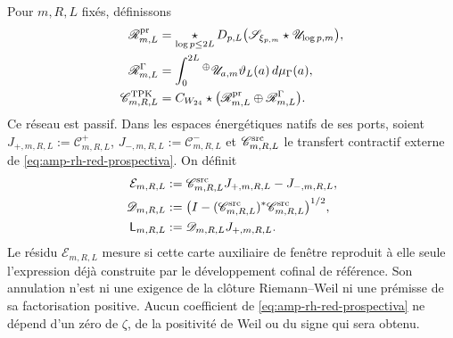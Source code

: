 \begin{theorem}
\label{thm:amp-rh-acoplamiento-prospectivo}
Pour \(m,R,L\) fixés, définissons
\begin{align}
 \mathscr R^{\rm pr}_{m,L}
 &=
 \mathop{\star}_{\log p\leq2L}
 D_{p,L}\bigl(\mathscr S_{\xi_{p,m}}\star
              \mathscr U_{\log p,m}\bigr),\nonumber\\
 \mathscr R^\Gamma_{m,L}
 &=
 \int_0^{2L}{}^\oplus
 \mathscr U_{a,m}
 \vartheta_L(a)\,d\mu_\Gamma(a),\nonumber\\
 \mathscr C^{\rm TPK}_{m,R,L}
 &=C_{W_{24}}\star
 \bigl(\mathscr R^{\rm pr}_{m,L}
       \oplus\mathscr R^\Gamma_{m,L}\bigr).
 \label{eq:amp-rh-red-prospectiva}
\end{align}
Ce réseau est passif. Dans les espaces énergétiques natifs de ses ports, soient \(J_{+,m,R,L}:=\mathcal C^+_{m,R,L}\), \(J_{-,m,R,L}:=\mathcal C^-_{m,R,L}\) et \(\mathscr C^{\rm src}_{m,R,L}\) le transfert contractif externe de \eqref{eq:amp-rh-red-prospectiva}. On définit
\begin{equation}\label{eq:amp-rh-publicaciones-construidas}
 \begin{aligned}
 \mathcal E_{m,R,L}
 &:=\mathscr C^{\rm src}_{m,R,L}J_{+,m,R,L}
    -J_{-,m,R,L},\\
 \mathscr D_{m,R,L}
 &:=\bigl(I-(\mathscr C^{\rm src}_{m,R,L})^*
                  \mathscr C^{\rm src}_{m,R,L}\bigr)^{1/2},\\
 \mathsf L_{m,R,L}&:=\mathscr D_{m,R,L}J_{+,m,R,L}.
 \end{aligned}
\end{equation}
Le résidu \(\mathcal E_{m,R,L}\) mesure si cette carte auxiliaire de fenêtre reproduit à elle seule l'expression déjà construite par le développement cofinal de référence. Son annulation n'est ni une exigence de la clôture Riemann--Weil ni une prémisse de sa factorisation positive. Aucun coefficient de \eqref{eq:amp-rh-red-prospectiva} ne dépend d'un zéro de \(\zeta\), de la positivité de Weil ou du signe qui sera obtenu.
\end{theorem}

